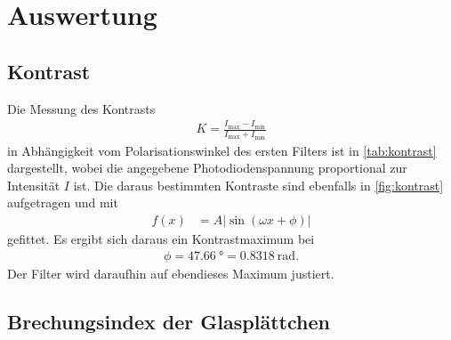 \section{Auswertung}
\label{sec:Auswertung}

\subsection{Kontrast}
Die Messung des Kontrasts
\begin{align}
  K = \frac{I_\mathrm{max}-I_\mathrm{min}}{I_\mathrm{max}+I_\mathrm{min}}
\end{align}
in Abhängigkeit vom Polarisationswinkel des ersten Filters ist in \autoref{tab:kontrast} dargestellt, wobei die angegebene Photodiodenspannung proportional zur Intensität $I$ ist. Die daraus bestimmten Kontraste sind ebenfalls in \autoref{fig:kontrast} aufgetragen und mit
\begin{align}
  f(x) &= A |\sin(\omega x + \phi)|
\end{align}
gefittet. Es ergibt sich daraus ein Kontrastmaximum bei
\begin{align}
  \phi = \SI{47.66}{\degree} = \SI{0.8318}{\radian}.
\end{align}
Der Filter wird daraufhin auf ebendieses Maximum justiert.


\subsection{Brechungsindex der Glasplättchen}

